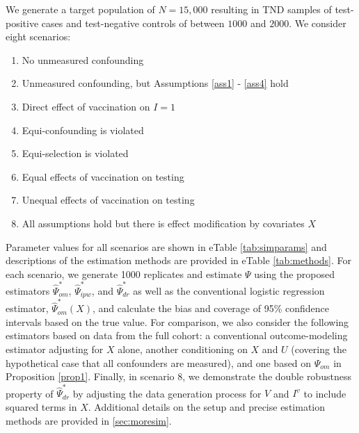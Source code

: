 \documentclass[11pt]{article}
\begin{document}
 We generate a target population of $N = 15,000$ resulting in TND samples of test-positive cases and test-negative controls of between $1000$ and $2000$. We consider eight scenarios: 
 \begin{enumerate}
    \item No unmeasured confounding
    \item Unmeasured confounding, but Assumptions \ref{ass1} - \ref{ass4} hold
    \item Direct effect of vaccination on $I=1$
    \item Equi-confounding is violated
    \item Equi-selection is violated
    \item Equal effects of vaccination on testing
    \item Unequal effects of vaccination on testing
    \item All assumptions hold but there is effect modification by covariates $X$
 \end{enumerate}
 Parameter values for all scenarios are shown in eTable \ref{tab:simparams} and descriptions of the estimation methods are provided in eTable \ref{tab:methods}. For each scenario, we generate 1000 replicates and estimate $\Psi$ using the proposed estimators $\widehat{\Psi}_{om}^*$, $\widehat{\Psi}_{ipw}^*$, and $\widehat{\Psi}_{dr}^*$ as well as the conventional logistic regression estimator, $\widehat{\Psi}_{om}^*(X)$, and calculate the bias and coverage of 95\% confidence intervals based on the true value. For comparison, we also consider the following estimators based on data from the full cohort: a conventional outcome-modeling estimator adjusting for $X$ alone, another conditioning on $X$ and $U$ (covering the hypothetical case that all confounders are measured), and one based on $\Psi_{om}$ in Proposition \ref{prop1}. Finally, in scenario 8, we demonstrate the double robustness property of $\widehat{\Psi}_{dr}^*$ by adjusting the data generation process for $V$ and $I^v$ to include squared terms in $X$. Additional details on the setup and precise estimation methods are provided in  \ref{sec:moresim}.
\end{document}
